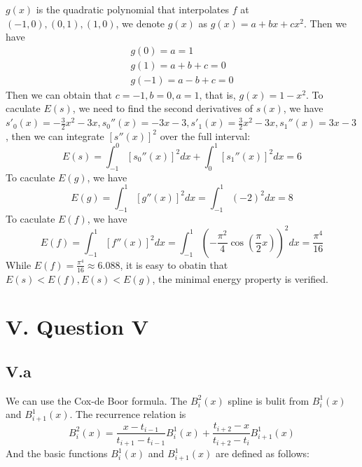 \documentclass[a4paper]{article}
\begin{document}
$g(x)$ is the quadratic polynomial that interpolates $f$ at $(-1,0),(0,1),(1,0)$, we denote $g(x)$ as $g(x)=a+bx+cx^2$. Then we have
\begin{align}
  g(0)=a=1\\
  g(1)=a+b+c=0\\
  g(-1)=a-b+c=0
\end{align}
Then we can obtain that $c=-1,b=0,a=1$, that is, $g(x)=1-x^2$.\newline
To caculate $E(s)$, we need to find the second derivatives of $s(x)$, we have $s'_0(x)=-\frac{3}{2}x^2-3x,s_0''(x)=-3x-3,s'_1(x)=\frac{3}{2}x^2-3x,s_1''(x)=3x-3$, then we can integrate $[s''(x)]^2$ over the full interval:
\begin{equation}
  E(s)=\int_{-1}^0[s_0''(x)]^2dx+\int_{0}^{1}[s_1''(x)]^2dx=6
\end{equation}
\newline To caculate $E(g)$, we have 
\begin{equation}
  E(g)=\int_{-1}^{1}[g''(x)]^2 dx = \int_{-1}^1(-2)^2dx = 8
\end{equation}
\newline To caculate $E(f)$, we have
\begin{equation}
  E(f) = \int_{-1}^{1}[f''(x)]^2dx=\int_{-1}^1(-\frac{\pi^2}{4}\cos(\frac{\pi}{2}x))^2dx=\frac{\pi^4}{16}  
\end{equation}
While $E(f)=\frac{\pi^4}{16}\approx 6.088$, it is easy to obatin that $E(s)<E(f),E(s)<E(g)$, the minimal energy property is verified.

\section*{V. Question V}

\subsection*{V.a}
We can use the Cox-de Boor formula. The $B_i^2(x)$ spline is bulit from $B_i^1(x)$ and $B_{i+1}^1(x)$. The recurrence relation is 
\begin{equation}
  B_i^2(x)=\frac{x-t_{i-1}}{t_{i+1}-t_{i-1}}B_i^1(x)+\frac{t_{i+2}-x}{t_{i+2}-t_i}B_{i+1}^1(x)
\end{equation}
And the basic functions $B_i^1(x)$ and $B_{i+1}^1(x)$ are defined as follows:
\end{document}
